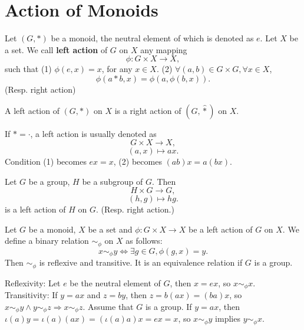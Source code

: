\section{Action of Monoids}
\begin{definitionenv}
    Let $(G, *)$ be a monoid,  the neutral element of which is denoted as $e$. Let $X$ be a set. We call \textbf{left action} of $G$ on $X$ any mapping 
    $$\phi:G\times X\rightarrow X, $$
    such that 
    \newline
    (1) $\phi(e, x)=x$,  for any $x\in X$.
    \newline
    (2) $\forall (a, b)\in G\times G, \forall x\in X$, 
    $$\phi(a*b, x)=\phi(a, \phi(b, x)).$$
    (Resp. right action)
\end{definitionenv}
\begin{remark}
    A left action of $(G, *)$ on $X$ is a right action of $(G, \hat{*})$ on $X$.
\end{remark}
\begin{notationenv}
    If $*=\cdot$,  a left action is usually denoted as 
    $$G\times X\longrightarrow X, $$
    $$(a, x) \longmapsto ax.$$
    Condition (1) becomes $ex=x$,  (2) becomes $(ab)x=a(bx)$.
\end{notationenv}
\begin{exampleenv}
    Let $G$ be a group,  $H$ be a subgroup of $G$. Then 
    $$H\times G\longrightarrow G, $$
    $$(h, g)\longmapsto hg.$$
    is a left action of $H$ on $G$. (Resp. right action.)
\end{exampleenv}
\begin{propositionenv}
    Let $G$ be a monoid,  $X$ be a set and $\phi:G\times X\longrightarrow X$ be a left action of $G$ on $X$. We define a binary relation $\sim_{\phi}$ on $X$ as follows:
    $$x\sim_{\phi}y\Leftrightarrow \exists g\in G, \phi(g, x)=y.$$
Then $\sim_{\phi}$ is reflexive and transitive. It is an equivalence relation if $G$ is a group.
\end{propositionenv}
\begin{proofenv}
    \quad\newline
    Reflexivity: Let $e$ be the neutral element of $G$,  then $x=ex$,  so $x\sim_{\phi}x$.
    \newline
    Transitivity: If $y=ax$ and $z=by$,  then $z=b(ax)=(ba)x$,  so $x\sim_{\phi}y \wedge y\sim_{\phi}z \Rightarrow x\sim_{\phi}z$.
    \newline
    Assume that $G$ is a group. If $y=ax$,  then $\iota(a)y=\iota(a)(ax)=(\iota(a)a)x=ex=x$,  so $x\sim_{\phi}y$ implies $y\sim_{\phi}x$.
\end{proofenv}
